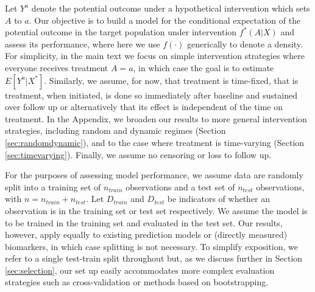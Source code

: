 Let $Y^a$ denote the potential outcome under a hypothetical intervention which sets $A$ to $a$. Our objective is to build a model for the conditional expectation of the potential outcome in the target population under intervention $f^*(A|X)$ and assess its performance, where here we use $f(\cdot)$ generically to denote a density. For simplicity, in the main text we focus on simple intervention strategies where everyone receives treatment $A = a$, in which case the goal is to estimate $E[Y^a | X^*]$. Similarly, we assume, for now, that treatment is time-fixed, that is treatment, when initiated, is done so immediately after baseline and sustained over follow up or alternatively that its effect is independent of the time on treatment. In the Appendix, we broaden our results to more general intervention strategies, including random and dynamic regimes (Section \ref{sec:randomdynamic}), and to the case where treatment is time-varying (Section \ref{sec:timevarying}). Finally, we assume no censoring or loss to follow up. 

For the purposes of assessing model performance, we assume data are randomly split into a training set of $n_{train}$ observations and a test set of $n_{test}$ observations, with $n = n_{train} + n_{test}$. Let $D_{train}$ and $D_{test}$ be indicators of whether an observation is in the training set or test set respectively. We assume the model is to be trained in the training set and evaluated in the test set. Our results, however, apply equally to existing prediction models or (directly measured) biomarkers, in which case splitting is not necessary. To simplify exposition, we refer to a single test-train split throughout but, as we discuss further in Section \ref{sec:selection}, our set up easily accommodates more complex evaluation strategies such as cross-validation or methods based on bootstrapping. %

